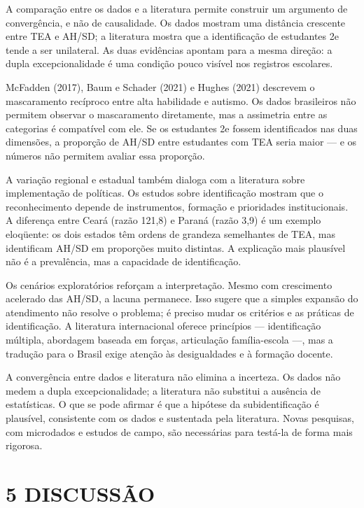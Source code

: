A comparação entre os dados e a literatura permite construir um
argumento de convergência, e não de causalidade. Os dados mostram uma
distância crescente entre TEA e AH/SD; a literatura mostra que a
identificação de estudantes 2e tende a ser unilateral. As duas
evidências apontam para a mesma direção: a dupla excepcionalidade é uma
condição pouco visível nos registros escolares.

McFadden (2017), Baum e Schader (2021) e Hughes (2021) descrevem o
mascaramento recíproco entre alta habilidade e autismo. Os dados
brasileiros não permitem observar o mascaramento diretamente, mas a
assimetria entre as categorias é compatível com ele. Se os estudantes 2e
fossem identificados nas duas dimensões, a proporção de AH/SD entre
estudantes com TEA seria maior --- e os números não permitem avaliar
essa proporção.

A variação regional e estadual também dialoga com a literatura sobre
implementação de políticas. Os estudos sobre identificação mostram que o
reconhecimento depende de instrumentos, formação e prioridades
institucionais. A diferença entre Ceará (razão 121,8) e Paraná (razão
3,9) é um exemplo eloqüente: os dois estados têm ordens de grandeza
semelhantes de TEA, mas identificam AH/SD em proporções muito distintas.
A explicação mais plausível não é a prevalência, mas a capacidade de
identificação.

Os cenários exploratórios reforçam a interpretação. Mesmo com
crescimento acelerado das AH/SD, a lacuna permanece. Isso sugere que a
simples expansão do atendimento não resolve o problema; é preciso mudar
os critérios e as práticas de identificação. A literatura internacional
oferece princípios --- identificação múltipla, abordagem baseada em
forças, articulação família-escola ---, mas a tradução para o Brasil
exige atenção às desigualdades e à formação docente.

A convergência entre dados e literatura não elimina a incerteza. Os
dados não medem a dupla excepcionalidade; a literatura não substitui a
ausência de estatísticas. O que se pode afirmar é que a hipótese da
subidentificação é plausível, consistente com os dados e sustentada pela
literatura. Novas pesquisas, com microdados e estudos de campo, são
necessárias para testá-la de forma mais rigorosa.

\section{5 DISCUSSÃO}\label{discussuxe3o}

